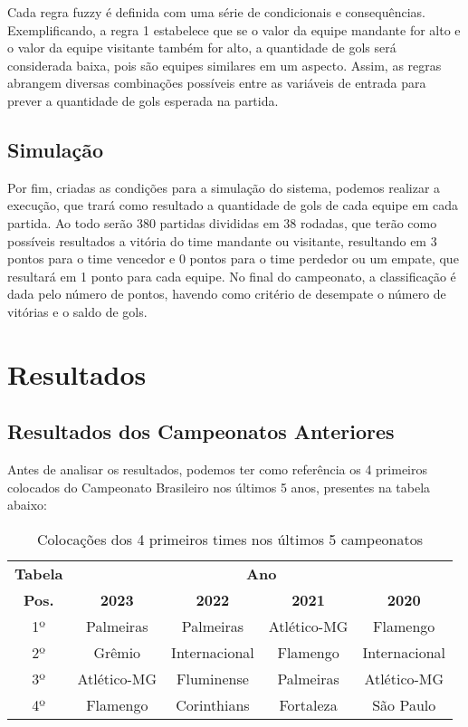 \documentclass[conference]{IEEEtran}
\begin{document}
Cada regra fuzzy é definida com uma série de condicionais e consequências. 
Exemplificando, a regra 1 estabelece que se o valor da equipe mandante for alto 
e o valor da equipe visitante também for alto, a quantidade de gols será 
considerada baixa, pois são equipes similares em um aspecto. Assim, as regras 
abrangem diversas combinações possíveis entre as variáveis de entrada para 
prever a quantidade de gols esperada na partida.

\subsection{Simulação}
\indent Por fim, criadas as condições para a simulação do sistema, podemos 
realizar a execução, que trará como resultado a quantidade de gols de cada 
equipe em cada partida. Ao todo serão 380 partidas divididas em 38 rodadas, que 
terão como possíveis resultados a vitória do time mandante ou visitante, 
resultando em 3 pontos para o time vencedor e 0 pontos para o time perdedor ou 
um empate, que resultará em 1 ponto para cada equipe. No final do campeonato, a 
classificação é dada pelo número de pontos, havendo como critério de desempate o 
número de vitórias e o saldo de gols.

\section{Resultados}

\subsection{Resultados dos Campeonatos Anteriores}

\indent Antes de analisar os resultados, podemos ter como referência os 4 
primeiros colocados do Campeonato Brasileiro nos últimos 5 anos, presentes na 
tabela abaixo:

\begin{table}[htbp]
    \caption{Colocações dos 4 primeiros times nos últimos 5 campeonatos}
    \begin{center}
        \begin{tabular}{|c|c|c|c|c|}
        \hline
        \textbf{Tabela} & \multicolumn{4}{|c|}{\textbf{Ano}} \\
        \cline{1-5} 
        \textbf{Pos.} & \textbf{2023} & \textbf{2022} & \textbf{2021} & \textbf{2020}\\
        \hline
        1º & Palmeiras & Palmeiras & Atlético-MG & Flamengo\\
        \hline
        2º & Grêmio & Internacional & Flamengo & Internacional\\
        \hline
        3º & Atlético-MG & Fluminense & Palmeiras & Atlético-MG\\
        \hline
        4º & Flamengo & Corinthians & Fortaleza & São Paulo\\
        \hline
    \end{tabular}
    \label{tab1}
    \end{center}
\end{table}
\end{document}
